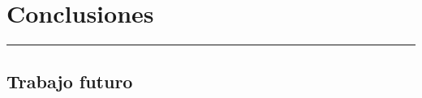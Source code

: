 \chapter{Conclusiones}\label{capit:cap5}
\vspace{-2.0325ex}%
\noindent
\rule{\textwidth}{0.5pt}
\vspace{-5.5ex}%
\newcommand{\pushline}{\Indp}%



\section{Trabajo futuro}\label{futureWork} 
\newpage
